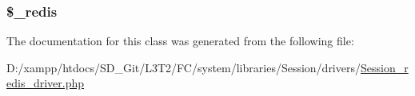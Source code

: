 \subsubsection[{\$\+\_\+redis}]{\setlength{\rightskip}{0pt plus 5cm}\$\+\_\+redis\hspace{0.3cm}{\ttfamily [protected]}}\label{class_c_i___session__redis__driver_a36de60a8fcbe3efac91a87577d0728de}


The documentation for this class was generated from the following file\+:\begin{DoxyCompactItemize}
\item 
D\+:/xampp/htdocs/\+S\+D\+\_\+\+Git/\+L3\+T2/\+F\+C/system/libraries/\+Session/drivers/\hyperlink{_session__redis__driver_8php}{Session\+\_\+redis\+\_\+driver.\+php}\end{DoxyCompactItemize}

